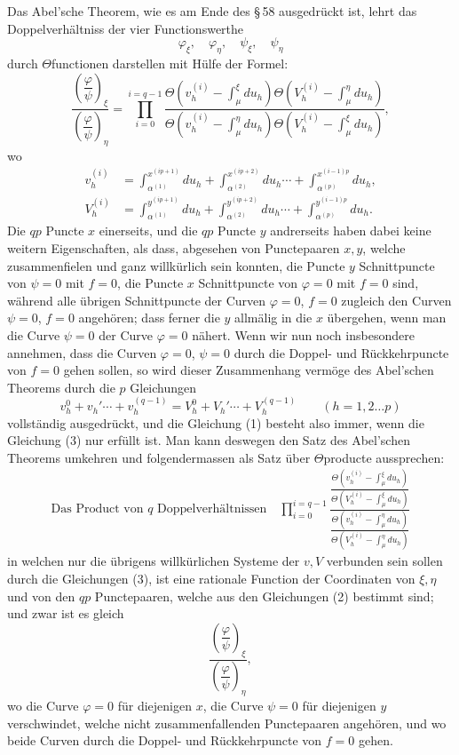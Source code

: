 \documentclass[10pt]{article}
\begin{document}
Das Abel'sche Theorem, wie es am Ende des \S\,58 ausgedrückt ist, lehrt das Doppelverhältniss der vier Functionswerthe
\[
\varphi_\xi,\quad \varphi_\eta,\quad \psi_\xi,\quad \psi_\eta
\]
durch \(\Theta\)functionen darstellen mit Hülfe der Formel:
\[
\tag{1}
\frac{\left(\dfrac{\varphi}{\psi}\right)_{\xi}}
     {\left(\dfrac{\varphi}{\psi}\right)_{\eta}}
=
\prod_{i=0}^{i=q-1}
\frac{\Theta\left(v_h^{(i)}-\int_{\mu}^{\xi}du_h\right)
      \Theta\left(V_h^{(i)}-\int_{\mu}^{\eta}du_h\right)}
     {\Theta\left(v_h^{(i)}-\int_{\mu}^{\eta}du_h\right)
      \Theta\left(V_h^{(i)}-\int_{\mu}^{\xi}du_h\right)},
\]
wo
\[
\tag{2}
\begin{aligned}
v_h^{(i)}&=\int_{\alpha^{(1)}}^{x^{(ip+1)}}du_h+
\int_{\alpha^{(2)}}^{x^{(ip+2)}}du_h\cdots+
\int_{\alpha^{(p)}}^{x^{(i-1)p}}du_h,\\
V_h^{(i)}&=\int_{\alpha^{(1)}}^{y^{(ip+1)}}du_h+
\int_{\alpha^{(2)}}^{y^{(ip+2)}}du_h\cdots+
\int_{\alpha^{(p)}}^{y^{(i-1)p}}du_h.
\end{aligned}
\]
Die \(q p\) Puncte \(x\) einerseits, und die \(q p\) Puncte \(y\) andrerseits haben dabei keine weitern Eigenschaften, als dass, abgesehen von Punctepaaren \(x,y\), welche zusammenfielen und ganz willkürlich sein konnten, die Puncte \(y\) Schnittpuncte von \(\psi=0\) mit \(f=0\), die Puncte \(x\) Schnittpuncte von \(\varphi=0\) mit \(f=0\) sind, während alle übrigen Schnittpuncte der Curven \(\varphi=0\), \(f=0\) zugleich den Curven \(\psi=0\), \(f=0\) angehören; dass ferner die \(y\) allmälig in die \(x\) übergehen, wenn man die Curve \(\psi=0\) der Curve \(\varphi=0\) nähert. Wenn wir nun noch insbesondere annehmen, dass die Curven \(\varphi=0\), \(\psi=0\) durch die Doppel- und Rückkehrpuncte von \(f=0\) gehen sollen, so wird dieser Zusammenhang vermöge des Abel'schen Theorems durch die \(p\) Gleichungen
\[
\tag{3}
 v_h^0+v_h'\cdots+v_h^{(q-1)}=V_h^0+V_h'\cdots+V_h^{(q-1)}
 \qquad(h=1,2\ldots p)
\]
vollständig ausgedrückt, und die Gleichung (1) besteht also immer, wenn die Gleichung (3) nur erfüllt ist. Man kann deswegen den Satz des Abel'schen Theorems umkehren und folgendermassen als Satz über \(\Theta\)producte aussprechen:
\[
\begin{gathered}
\text{Das Product von }q\text{ Doppelverhältnissen}\quad
\prod_{i=0}^{i=q-1}
\frac{\dfrac{\Theta\left(v_h^{(i)}-\int_{\mu}^{\xi}du_h\right)}
              {\Theta\left(V_h^{(i)}-\int_{\mu}^{\xi}du_h\right)}}
     {\dfrac{\Theta\left(v_h^{(i)}-\int_{\mu}^{\eta}du_h\right)}
              {\Theta\left(V_h^{(i)}-\int_{\mu}^{\eta}du_h\right)}}
\end{gathered}
\]
in welchen nur die übrigens willkürlichen Systeme der \(v,V\) verbunden sein sollen durch die Gleichungen (3), ist eine rationale Function der Coordinaten von \(\xi,\eta\) und von den \(q p\) Punctepaaren, welche aus den Gleichungen (2) bestimmt sind; und zwar ist es gleich
\[
\frac{\left(\dfrac{\varphi}{\psi}\right)_{\xi}}
     {\left(\dfrac{\varphi}{\psi}\right)_{\eta}},
\]
wo die Curve \(\varphi=0\) für diejenigen \(x\), die Curve \(\psi=0\) für diejenigen \(y\) verschwindet, welche nicht zusammenfallenden Punctepaaren angehören, und wo beide Curven durch die Doppel- und Rückkehrpuncte von \(f=0\) gehen.
\end{document}
